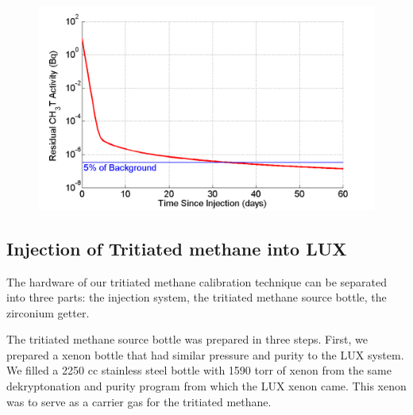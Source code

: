 \begin{figure}
\includegraphics[scale=.3]{OutgassingSim.png} 
\label{OutgassingSim}
\end{figure}


\subsection{Injection of Tritiated methane into LUX}

The hardware of our tritiated methane calibration technique can be separated into three parts: the injection system, the tritiated methane source bottle, the zirconium getter.

The tritiated methane source bottle was prepared in three steps. First, we prepared a xenon bottle that had similar pressure and purity to the LUX system. We filled a 2250 cc stainless steel bottle with 1590 torr of xenon from the same dekryptonation and purity program from which the LUX xenon came. This xenon was to serve as a carrier gas for the tritiated methane. 

